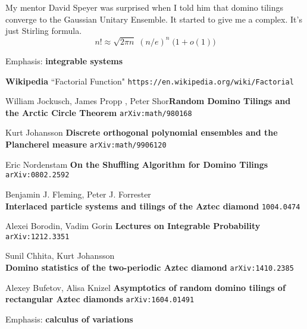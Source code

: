 \documentclass[12pt]{article}
\begin{document}
\newpage

\noindent My mentor David Speyer was surprised when I told him that domino tilings converge to the Gaussian Unitary Ensemble.  It started to give me a complex.  It's just Stirling formula.
$$ n! \approx \sqrt{2\pi n} \;(n/e)^n \; \big(1 + o(1) \big)$$

\newpage

\noindent Emphasis:  \textbf{integrable systems}


\selectfont \fontsize{12}{10}\selectfont

\begin{thebibliography}{}

\item \textbf{Wikipedia} ``Factorial Function" \texttt{https://en.wikipedia.org/wiki/Factorial}

\item William Jockusch, James Propp , Peter Shor\textbf{Random Domino Tilings and the Arctic Circle Theorem} \texttt{arXiv:math/980168}

\item Kurt Johansson \textbf{Discrete orthogonal polynomial ensembles and the Plancherel measure} \texttt{arXiv:math/9906120}

\item Eric Nordenstam \textbf{On the Shuffling Algorithm for Domino Tilings} \texttt{arXiv:0802.2592}

\item Benjamin J. Fleming, Peter J. Forrester \\ \textbf{Interlaced particle systems and tilings of the Aztec diamond} \texttt{1004.0474}

\item Alexei Borodin, Vadim Gorin \textbf{Lectures on Integrable Probability} \texttt{arXiv:1212.3351}

\item Sunil Chhita, Kurt Johansson \\ \textbf{Domino statistics of the two-periodic Aztec diamond} \texttt{arXiv:1410.2385}

\item Alexey Bufetov, Alisa Knizel \textbf{Asymptotics of random domino tilings of rectangular Aztec diamonds} \texttt{arXiv:1604.01491}

\end{thebibliography}

\selectfont \fontsize{20}{25}\selectfont

\noindent Emphasis:  \textbf{calculus of variations}
\end{document}
